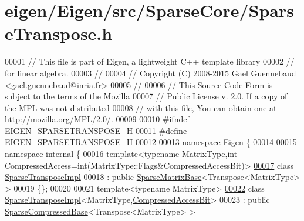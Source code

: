 \hypertarget{eigen_2_eigen_2src_2_sparse_core_2_sparse_transpose_8h_source}{}\section{eigen/\+Eigen/src/\+Sparse\+Core/\+Sparse\+Transpose.h}
\label{eigen_2_eigen_2src_2_sparse_core_2_sparse_transpose_8h_source}

\begin{DoxyCode}
00001 \textcolor{comment}{// This file is part of Eigen, a lightweight C++ template library}
00002 \textcolor{comment}{// for linear algebra.}
00003 \textcolor{comment}{//}
00004 \textcolor{comment}{// Copyright (C) 2008-2015 Gael Guennebaud <gael.guennebaud@inria.fr>}
00005 \textcolor{comment}{//}
00006 \textcolor{comment}{// This Source Code Form is subject to the terms of the Mozilla}
00007 \textcolor{comment}{// Public License v. 2.0. If a copy of the MPL was not distributed}
00008 \textcolor{comment}{// with this file, You can obtain one at http://mozilla.org/MPL/2.0/.}
00009 
00010 \textcolor{preprocessor}{#ifndef EIGEN\_SPARSETRANSPOSE\_H}
00011 \textcolor{preprocessor}{#define EIGEN\_SPARSETRANSPOSE\_H}
00012 
00013 \textcolor{keyword}{namespace }\hyperlink{namespace_eigen}{Eigen} \{ 
00014 
00015 \textcolor{keyword}{namespace }\hyperlink{namespaceinternal}{internal} \{
00016   \textcolor{keyword}{template}<\textcolor{keyword}{typename} MatrixType,\textcolor{keywordtype}{int} CompressedAccess=\textcolor{keywordtype}{int}(MatrixType::Flags&CompressedAccessBit)>
\hyperlink{class_eigen_1_1internal_1_1_sparse_transpose_impl}{00017}   \textcolor{keyword}{class }\hyperlink{class_eigen_1_1internal_1_1_sparse_transpose_impl}{SparseTransposeImpl}
00018     : \textcolor{keyword}{public} \hyperlink{group___sparse_core___module_class_eigen_1_1_sparse_matrix_base}{SparseMatrixBase}<Transpose<MatrixType> >
00019   \{\};
00020   
00021   \textcolor{keyword}{template}<\textcolor{keyword}{typename} MatrixType>
\hyperlink{class_eigen_1_1internal_1_1_sparse_transpose_impl_3_01_matrix_type_00_01_compressed_access_bit_01_4}{00022}   \textcolor{keyword}{class }\hyperlink{class_eigen_1_1internal_1_1_sparse_transpose_impl}{SparseTransposeImpl}<MatrixType,\hyperlink{group__flags_gaed0244284da47a2b8661261431173caf}{CompressedAccessBit}>
00023     : \textcolor{keyword}{public} \hyperlink{group___sparse_core___module_class_eigen_1_1_sparse_compressed_base}{SparseCompressedBase}<Transpose<MatrixType> >

\end{DoxyCode}
